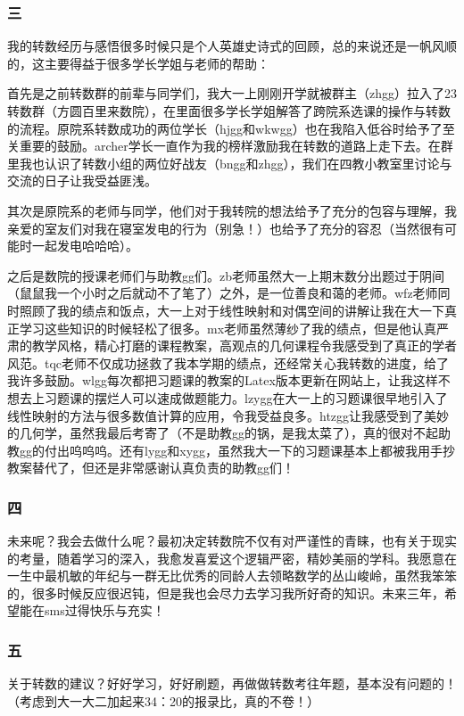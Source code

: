 \documentclass[12pt, a4paper, oneside]{ctexart}
\begin{document}
\subsubsection{三}

我的转数经历与感悟很多时候只是个人英雄史诗式的回顾，总的来说还是一帆风顺的，这主要得益于很多学长学姐与老师的帮助：

首先是之前转数群的前辈与同学们，我大一上刚刚开学就被群主（zhgg）拉入了23转数群（方圆百里来数院），在里面很多学长学姐解答了跨院系选课的操作与转数的流程。原院系转数成功的两位学长（hjgg和wkwgg）也在我陷入低谷时给予了至关重要的鼓励。archer学长一直作为我的榜样激励我在转数的道路上走下去。在群里我也认识了转数小组的两位好战友（bngg和zhgg），我们在四教小教室里讨论与交流的日子让我受益匪浅。

其次是原院系的老师与同学，他们对于我转院的想法给予了充分的包容与理解，我亲爱的室友们对我在寝室发电的行为（别急！）也给予了充分的容忍（当然很有可能时一起发电哈哈哈）。

之后是数院的授课老师们与助教gg们。zb老师虽然大一上期末数分出题过于阴间（鼠鼠我一个小时之后就动不了笔了）之外，是一位善良和蔼的老师。wfz老师同时照顾了我的绩点和饭点，大一上对于线性映射和对偶空间的讲解让我在大一下真正学习这些知识的时候轻松了很多。mx老师虽然薄纱了我的绩点，但是他认真严肃的教学风格，精心打磨的课程教案，高观点的几何课程令我感受到了真正的学者风范。tqc老师不仅成功拯救了我本学期的绩点，还经常关心我转数的进度，给了我许多鼓励。wlgg每次都把习题课的教案的Latex版本更新在网站上，让我这样不想去上习题课的摆烂人可以速成做题能力。lzygg在大一上的习题课很早地引入了线性映射的方法与很多数值计算的应用，令我受益良多。htzgg让我感受到了美妙的几何学，虽然我最后考寄了（不是助教gg的锅，是我太菜了），真的很对不起助教gg的付出呜呜呜。还有lygg和xygg，虽然我大一下的习题课基本上都被我用手抄教案替代了，但还是非常感谢认真负责的助教gg们！

\subsubsection{四}
未来呢？我会去做什么呢？最初决定转数院不仅有对严谨性的青睐，也有关于现实的考量，随着学习的深入，我愈发喜爱这个逻辑严密，精妙美丽的学科。我愿意在一生中最机敏的年纪与一群无比优秀的同龄人去领略数学的丛山峻岭，虽然我笨笨的，很多时候反应很迟钝，但是我也会尽力去学习我所好奇的知识。未来三年，希望能在sms过得快乐与充实！

\subsubsection{五}
关于转数的建议？好好学习，好好刷题，再做做转数考往年题，基本没有问题的！（考虑到大一大二加起来34：20的报录比，真的不卷！）
\end{document}

